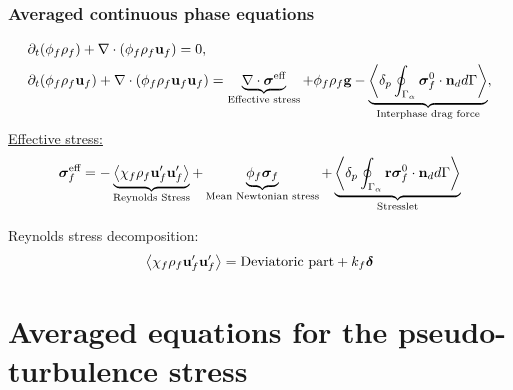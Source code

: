 \documentclass{sintefbeamer}
\begin{document}
\begin{frame}
  \frametitle{Averaged continuous phase equations}
\begin{align*}
  &\partial_t (\phi_f \rho_f)  
  + \mathbf{\nabla}\cdot (
      \phi_f \rho_f\textbf{u}_f
  )
  = 
  0,\\
  &\partial_t (\phi_f \rho_f\textbf{u}_f)
  + \mathbf{\nabla}\cdot 
      (\phi_f \rho_f\textbf{u}_f\textbf{u}_f)
  = 
  \underbrace{\mathbf{\nabla}\cdot \bm\sigma^\text{eff}}_\text{Effective stress}
  + \phi_f \rho_f \textbf{g} 
  - \underbrace{\left<\delta_p \oint_{\Gamma_{\alpha}} {\bm{\sigma}_f^0 \cdot \textbf{n}_d} d\Gamma\right>}_\text{Interphase drag force},
\end{align*}
\pause
\underline{Effective stress: } 
\begin{equation*}
  \bm{\sigma}_f^\text{eff}
  =
  - \underbrace{\avg{\chi_f\rho_f\textbf{u}_f'\textbf{u}_f'}}_\text{Reynolds Stress}
  + \underbrace{\phi_f \bm{\sigma}_f}_\text{Mean Newtonian stress}%
   + \underbrace{ {\pSavg{{\textbf{r}\bm{\sigma}_f^0 \cdot \textbf{n}_d}}}}_\text{Stresslet}
\end{equation*}
\pause

Reynolds stress decomposition: 
\begin{equation}
  \left<\chi_f\rho_f\textbf{u}_f'\textbf{u}_f'\right>
  = \text{Deviatoric part}
  + k_f \bm\delta
\end{equation}


\end{frame}


\section{Averaged equations for the pseudo-turbulence stress}
\end{document}
